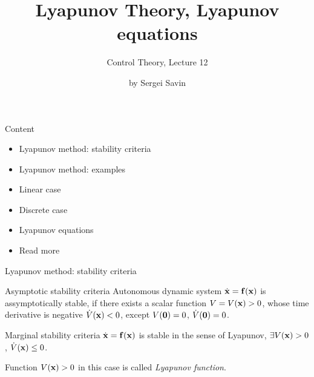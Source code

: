 \documentclass{beamer}
\title{Lyapunov Theory, Lyapunov equations}
\subtitle{Control Theory, Lecture 12}
\author{by Sergei Savin}
\date{\mydate}
\begin{document}
\maketitle


\begin{frame}{Content}

\begin{itemize}
\item Lyapunov method: stability criteria
\item Lyapunov method: examples
\item Linear case
\item Discrete case
\item Lyapunov equations
\item Read more
\end{itemize}

\end{frame}





\begin{frame}{Lyapunov method: stability criteria}
\begin{flushleft}

\begin{block}{Asymptotic stability criteria}
Autonomous dynamic system $\dot{\mathbf{x}} = \mathbf{f}(\mathbf{x})$ is assymptotically stable, if there exists a scalar function $V = V(\mathbf{x}) > 0$, whose time derivative is negative $\dot V(\mathbf{x}) < 0$, except $V(\mathbf{0}) = 0$, $\dot V(\mathbf{0}) = 0$.
\end{block}

\begin{block}{Marginal stability criteria}
$\dot{\mathbf{x}} = \mathbf{f}(\mathbf{x})$ is stable in the sense of Lyapunov, $\exists V(\mathbf{x}) > 0$, $\dot V(\mathbf{x}) \leq 0$.
\end{block}

\begin{definition}
Function $V(\mathbf{x}) > 0$ in this case is called \emph{Lyapunov function}.
\end{definition}


\end{flushleft}
\end{frame}
\end{document}
